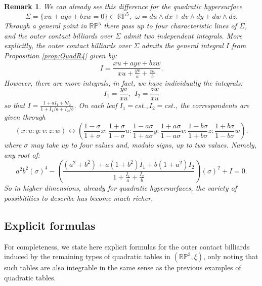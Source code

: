 \documentclass{article}
\newtheorem{rmk}{Remark}
\begin{document}
\begin{appendix}
\begin{rmk}
    We can already see this difference for the quadratic hypersurface
    \[ \Sigma = \{ xu + ayv + bzw = 0\}\subset\mathbb{RP}^5, ~~\omega = du\wedge dx + dv\wedge dy + dw\wedge dz. \]
    Through a general point in $\mathbb{RP}^5$ there pass up to {\em four} characteristic lines of $\Sigma$, and the outer contact billiards over $\Sigma$ admit {\em two} independent integrals. More explicitly,
   the outer contact billiards over $\Sigma$ admits the general integral $I$ from Proposition \ref{prop:QuadR4} given by:
        \[ I = \dfrac{xu + ayv + bzw}{xu + \frac{yv}{a} + \frac{zw}{b}}. \]
        However, there are more integrals; in fact, we have individually the integrals:
        \[ I_1 = \frac{yv}{xu}, ~~I_2 = \frac{zw}{xu} \]
        so that $I = \frac{1 + a I_1 + b I_2}{1 + I_1/a + I_2/b}$.  On each leaf $I_1 = cst., I_2 = cst.$, the correspondents are given through %
        \[ (x:u:y:v:z:w)\longleftrightarrow  \left(\frac{1-\sigma}{1+\sigma}x: \frac{1+\sigma}{1-\sigma}u:\frac{1-a\sigma}{1+a\sigma}y:\frac{1+a\sigma}{1-a\sigma}v : \frac{1-b\sigma}{1+b\sigma}z:\frac{1+b\sigma}{1-b\sigma}w\right).\]
        where $\sigma$ may take up to four values and, modulo signs, up to {\em two} values. Namely, any root of:
        \[  a^2 b^2(\sigma)^4 - \left(\frac{(a^2 + b^2) + a(1+b^2) I_1 + b(1+a^2)I_2}{1 + \frac{I_1}{a} + \frac{I_2}{b}}\right) (\sigma)^2 + I = 0. \]
        So in higher dimensions, already for quadratic hypersurfaces, the variety of possibilities to describe has become much richer.
\end{rmk}


\subsection{Explicit formulas}\label{sec:QuadExs}

For completeness, we state here explicit formulas for the outer contact billiards induced by the remaining types of quadratic tables in $(\mathbb{RP}^3,\xi)$, only noting that such tables are also integrable in the same sense as the previous examples of quadratic tables.



\end{appendix}
\end{document}
